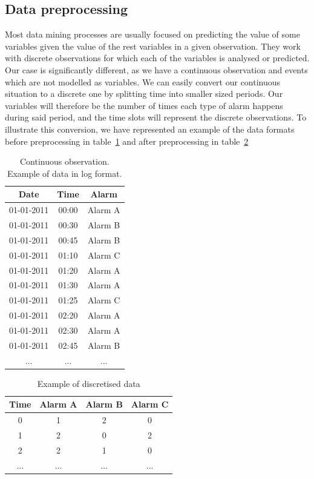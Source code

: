 \documentclass[a4paper,10pt]{report}
\begin{document}
\subsection{Data preprocessing}

Most data mining processes are usually focused on predicting the value of some variables given the value of the rest variables in a given observation. They work with discrete observations for which each of the variables is analysed or predicted. Our case is significantly different, as we have a continuous observation and events which are not modelled as variables. We can easily convert our continuous situation to a discrete one by splitting time into smaller sized periods. Our variables will therefore be the number of times each type of alarm happens during said period, and the time slots will represent the discrete observations. To illustrate this conversion, we have represented an example of the data formats before preprocessing in table~\ref{tab:data_before} and after preprocessing in table~\ref{tab:data_after}

\begin{table}
\begin{center}
\begin{tabular}{|c|c|c|}
\hline Date & Time & Alarm \\ 
\hline 01-01-2011 & 00:00 & Alarm A \\ 
\hline 01-01-2011 & 00:30 & Alarm B \\ 
\hline 01-01-2011 & 00:45 & Alarm B \\ 
\hline 01-01-2011 & 01:10 & Alarm C \\ 
\hline 01-01-2011 & 01:20 & Alarm A \\ 
\hline 01-01-2011 & 01:30 & Alarm A \\ 
\hline 01-01-2011 & 01:25 & Alarm C \\ 
\hline 01-01-2011 & 02:20 & Alarm A \\ 
\hline 01-01-2011 & 02:30 & Alarm A \\ 
\hline 01-01-2011 & 02:45 & Alarm B \\ 
\hline ... & ... & ... \\ 
\hline 
\end{tabular} 
\end{center} 
\caption {Continuous observation. Example of data in log format.} \label{tab:data_before} 
\end{table}

\begin{table}
\begin{center}
\begin{tabular}{|c|c|c|c|}
\hline Time & Alarm A & Alarm B & Alarm C \\ 
\hline 0 & 1 & 2 & 0 \\ 
\hline 1 & 2 & 0 & 2 \\ 
\hline 2 & 2 & 1 & 0 \\ 
\hline ... & ... & ... & ... \\ 
\hline 
\end{tabular} 
\end{center} 
\caption {Example of discretised data} \label{tab:data_after} 
\end{table}
\end{document}
